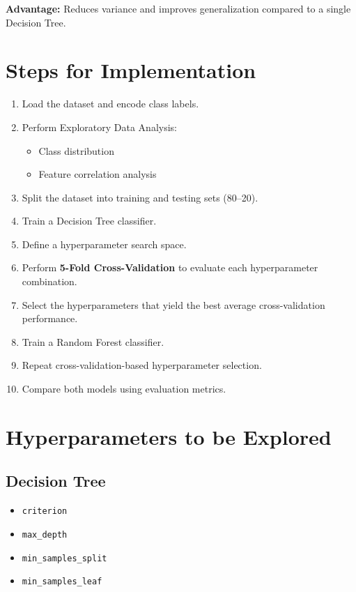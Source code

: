 \documentclass[11pt]{article}
\begin{document}
\textbf{Advantage:}  
Reduces variance and improves generalization compared to a single Decision Tree.


\section*{Steps for Implementation}

\begin{enumerate}[label=\arabic*.]
    \item Load the dataset and encode class labels.
    \item Perform Exploratory Data Analysis:
    \begin{itemize}
        \item Class distribution
        \item Feature correlation analysis
    \end{itemize}
    \item Split the dataset into training and testing sets (80--20).
    \item Train a Decision Tree classifier.
    \item Define a hyperparameter search space.
    \item Perform \textbf{5-Fold Cross-Validation} to evaluate each hyperparameter combination.
    \item Select the hyperparameters that yield the best average cross-validation performance.
    \item Train a Random Forest classifier.
    \item Repeat cross-validation-based hyperparameter selection.
    \item Compare both models using evaluation metrics.
\end{enumerate}


\section*{Hyperparameters to be Explored}

\subsection*{Decision Tree}
\begin{itemize}
    \item \texttt{criterion}
    \item \texttt{max\_depth}
    \item \texttt{min\_samples\_split}
    \item \texttt{min\_samples\_leaf}
\end{itemize}
\end{document}
